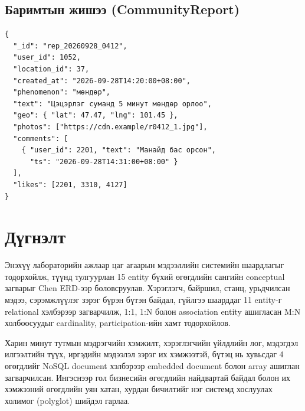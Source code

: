 \documentclass[12pt,a4paper]{article}
\begin{document}
\subsection{Баримтын жишээ (CommunityReport)}
\begin{Verbatim}[fontsize=\small,frame=single,framesep=3mm,samepage=true]
{
  "_id": "rep_20260928_0412",
  "user_id": 1052,
  "location_id": 37,
  "created_at": "2026-09-28T14:20:00+08:00",
  "phenomenon": "мөндөр",
  "text": "Цэцэрлэг суманд 5 минут мөндөр орлоо",
  "geo": { "lat": 47.47, "lng": 101.45 },
  "photos": ["https://cdn.example/r0412_1.jpg"],
  "comments": [
    { "user_id": 2201, "text": "Манайд бас орсон",
      "ts": "2026-09-28T14:31:00+08:00" }
  ],
  "likes": [2201, 3310, 4127]
}
\end{Verbatim}

\clearpage
\section*{Дүгнэлт}
Энэхүү лабораторийн ажлаар цаг агаарын мэдээллийн системийн шаардлагыг
тодорхойлж, түүнд тулгуурлан 15 entity бүхий өгөгдлийн сангийн conceptual
загварыг Chen ERD-ээр боловсруулав. Хэрэглэгч, байршил, станц, урьдчилсан
мэдээ, сэрэмжлүүлэг зэрэг бүрэн бүтэн байдал, гүйлгээ шаарддаг 11 entity-г
relational хэлбэрээр загварчилж, 1:1, 1:N болон association entity ашигласан
M:N холбоосуудыг cardinality, participation-ийн хамт тодорхойлов.

Харин минут тутмын мэдрэгчийн хэмжилт, хэрэглэгчийн үйлдлийн лог, мэдэгдэл
илгээлтийн түүх, иргэдийн мэдээлэл зэрэг их хэмжээтэй, бүтэц нь хувьсдаг
4 өгөгдлийг NoSQL document хэлбэрээр embedded document болон array ашиглан
загварчилсан. Ингэснээр гол бизнесийн өгөгдлийн найдвартай байдал болон
их хэмжээний өгөгдлийн уян хатан, хурдан бичилтийг нэг системд хослуулах
холимог (polyglot) шийдэл гарлаа.

\clearpage
\thispagestyle{empty}
\mbox{}
\clearpage
\end{document}
